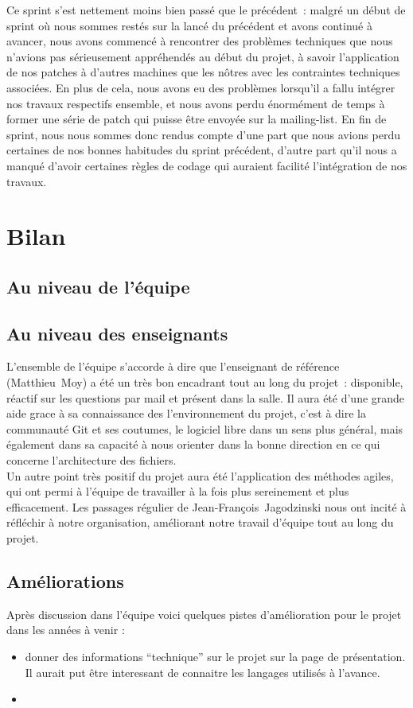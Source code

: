\documentclass[11pt]{article}
\begin{document}
  Ce sprint s'est nettement moins bien passé que le précédent~: malgré
  un début de sprint où nous sommes restés sur la lancé du précédent et
  avons continué à avancer, nous avons commencé à rencontrer des
  problèmes techniques que nous n'avions pas sérieusement appréhendés au
  début du projet, à savoir l'application de nos patches à d'autres
  machines que les nôtres avec les contraintes techniques
  associées. En plus de cela, nous avons eu des problèmes lorsqu'il a
  fallu intégrer nos travaux respectifs ensemble, et nous avons perdu
  énormément de temps à former une série de patch qui puisse être
  envoyée sur la mailing-list. En fin de sprint, nous nous sommes donc
  rendus compte d'une part que nous avions perdu certaines de nos bonnes
  habitudes du sprint précédent, d'autre part qu'il nous a manqué
  d'avoir certaines règles de codage qui auraient facilité l'intégration
  de nos travaux.

  \section{Bilan}

  \subsection*{Au niveau de l'équipe}

  \subsection*{Au niveau des enseignants}

  L'ensemble de l'équipe s'accorde à dire que l'enseignant de
  référence (Matthieu~Moy) a été un très bon encadrant tout au long du
  projet~: disponible, réactif sur les questions par mail et présent
  dans la salle. Il aura été d'une grande aide grace à sa connaissance
  des l'environnement du projet, c'est à dire la communauté Git et ses
  coutumes, le logiciel libre dans un sens plus général, mais
  également dans sa capacité à nous orienter dans la bonne direction
  en ce qui concerne l'architecture des fichiers.
  \\
  Un autre point très positif du projet aura été l'application des
  méthodes agiles, qui ont permi à l'équipe de travailler à la fois plus
  sereinement et plus efficacement. Les passages régulier de
  Jean-François~Jagodzinski nous ont incité à réfléchir à notre
  organisation, améliorant notre travail d'équipe tout au long du projet.

  \subsection*{Améliorations}

  Après discussion dans l'équipe voici quelques pistes d'amélioration pour le projet dans les années à venir : 

  \begin{itemize}
  \item donner des informations ``technique'' sur le projet sur la page de présentation. Il aurait put être interessant de connaitre les langages utilisés à l'avance. 
  \item 
  \end{itemize}
\end{document}
